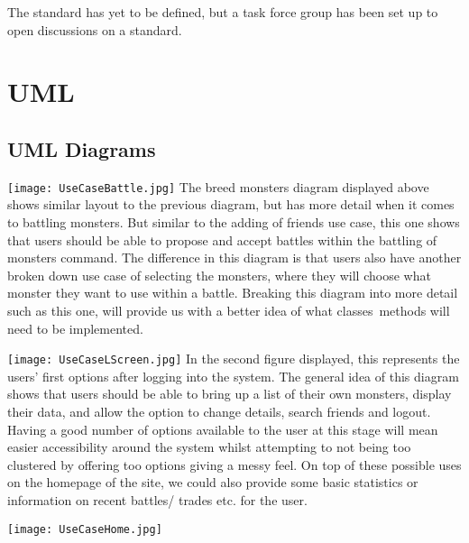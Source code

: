 \documentclass[a4paper]{article}
\begin{document}
The standard has yet to be defined, but a task force group has been set up to open discussions on a standard.
\clearpage


\section{UML}
\subsection{UML Diagrams}
\begin{center}
\texttt{[image: UseCaseBattle.jpg]}
The breed monsters diagram displayed above shows similar layout to the previous diagram, but has more detail when it comes to battling monsters. But similar to the adding of friends use case, this one shows that users should be able to propose and accept battles within the battling of monsters command. The difference in this diagram is that users also have another broken down use case of selecting the monsters, where they will choose what monster they want to use within a battle. Breaking this diagram into more detail such as this one, will provide us with a better idea of what classes\ methods will need to be implemented.

\texttt{[image: UseCaseLScreen.jpg]}
In the second figure displayed, this represents the users’ first options after logging into the system. The general idea of this diagram shows that users should be able to bring up a list of their own monsters, display their data, and allow the option to change details, search friends and logout. Having a good number of options available to the user at this stage will mean easier accessibility around the system whilst attempting to not being too clustered by offering too options giving a messy feel. On top of these possible uses on the homepage of the site, we could also provide some basic statistics or information on recent battles/ trades etc. for the user.

\texttt{[image: UseCaseHome.jpg]}


\end{center}
\end{document}
